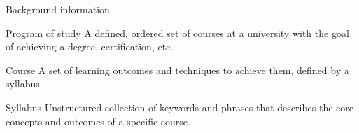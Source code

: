 \begin{frame}{Background information}

  \onslide<+->
  \begin{block}{Program of study}
    A defined, ordered set of courses at a university with the goal of
    achieving a degree, certification, etc.
  \end{block}

  \onslide<+->
  \begin{block}{Course}
    A set of learning outcomes and techniques to achieve them, defined by
    a syllabus.
  \end{block}

  \onslide<+->
  \begin{block}{Syllabus}
    Unstructured collection of keywords and phrases that describes the
    core concepts and outcomes of a specific course.
  \end{block}

\end{frame}
